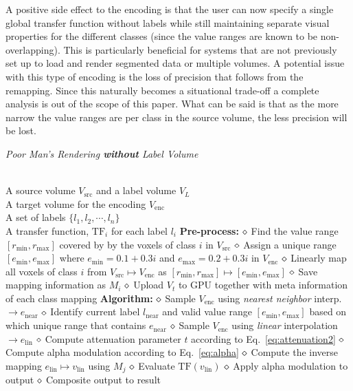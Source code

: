 \documentclass{egpubl}
\begin{document}
A positive side effect to the encoding is that the user can now specify a single global transfer function without labels while still maintaining separate visual properties for the different classes (since the value ranges are known to be non-overlapping). This is particularly beneficial for systems that are not previously set up to load and render segmented data or multiple volumes. A potential issue with this type of encoding is the loss of precision that follows from the remapping. Since this naturally becomes a situational trade-off a complete analysis is out of the scope of this paper. What can be said is that as the more narrow the value ranges are per class in the source volume, the less precision will be lost. 


\begin{algorithm}[t]
\caption{\label{code:2} \emph{Poor Man's Rendering \textbf{without} Label Volume}}
\begin{algorithmic}
\REQUIRE \quad\\
A source volume $V_\mathrm{src}$ and a label volume $V_L$\\
A target volume for the encoding $V_\mathrm{enc}$\\
A set of labels $\{ l_1, l_2, \cdots, l_n \}$ \\
A transfer function, $\mathrm{TF}_i$ for each label $l_i$ 
\STATE \hspace{-3mm}\textbf{Pre-process:}
 \nonumber
\STATE $\diamond$ Find the value range $[r_\mathrm{min}, r_\mathrm{max}]$ covered by by the voxels of class $i$ in $V_\mathrm{src}$
\STATE $\diamond$ Assign a unique range $[e_\mathrm{min},e_\mathrm{max}]$ where $e_\mathrm{min} = 0.1+0.3 i$ and $e_\mathrm{max} = 0.2+0.3 i$ in $V_\mathrm{enc}$
\STATE $\diamond$ Linearly map all voxels of class $i$ from $V_\mathrm{src} \mapsto V_\mathrm{enc}$ as $[r_\mathrm{min}, r_\mathrm{max}] \mapsto [e_\mathrm{min},e_\mathrm{max}]$
\STATE $\diamond$ Save mapping information as $M_i$
\ENDFOR
\STATE $\diamond$ Upload $V_t$ to GPU together with meta information of each class mapping
\STATE \hspace{-3mm}\textbf{Algorithm:}
 \nonumber
\STATE $\diamond$ Sample $V_\mathrm{enc}$ using \emph{nearest neighbor} interp. $\rightarrow e_\mathrm{near}$
\STATE $\diamond$ Identify current label $l_\mathrm{near}$ and valid value range $[e_\mathrm{min}, e_\mathrm{max}]$ based on which unique range that contains $e_\mathrm{near}$ 
\STATE $\diamond$ Sample $V_\mathrm{enc}$ using \emph{linear} interpolation $\rightarrow e_\mathrm{lin}$
\STATE $\diamond$ Compute attenuation parameter $t$ according to Eq.~\ref{eq:attenuation2}
\STATE $\diamond$ Compute alpha modulation according to Eq.~\ref{eq:alpha}
\STATE $\diamond$ Compute the inverse mapping $e_\mathrm{lin} \mapsto v_\mathrm{lin}$ using $M_j$
\STATE $\diamond$ Evaluate $\mathrm{TF}(v_\mathrm{lin})$ 
\STATE $\diamond$ Apply alpha modulation to output
\STATE $\diamond$ Composite output to result
\ENDFOR
\end{algorithmic}
\end{algorithm}
\end{document}

